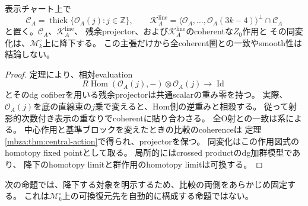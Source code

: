 \begin{corollary}[全O開上の同変compact残余圏]
\label{mbrd:cor:residual-family}
表示チャート上で
\[
 \mathcal C_A=\operatorname{thick}\{\mathcal O_A(j):j\in\mathbb Z\},
 \qquad
 \mathcal K_A^{\mathrm{line}}
 =\langle\mathcal O_A,\ldots,\mathcal O_A(3k-4)\rangle^\perp
    \cap\mathcal C_A
\]
と置く。$\mathcal C_A$、$\mathcal K_A^{\mathrm{line}}$、
残余projector、および$\mathcal K_A^{\mathrm{line}}$のcoherentな$Z_0$作用と
その同変化は、$\mathcal M_k^\circ$上に降下する。
この主張だけから全coherent圏との一致やsmooth性は結論しない。
\end{corollary}
\begin{proof}
定理により、相対evaluation
\[
 R\operatorname{Hom}(\mathcal O_A(j),-)\otimes\mathcal O_A(j)
       \longrightarrow\operatorname{Id}
\]
とそのdg cofiberを用いる残余projectorは共通scalarの重み零を持つ。
実際、$\mathcal O_A(j)$を底の直線束の$j$乗で変えると、Hom側の逆重みと相殺する。
従って射影的次数付き表示の重なりでcoherentに貼り合わさる。
全O射との一致は系による。
中心作用と基準ブロックを変えたときの比較のcoherenceは
定理\ref{mbza:thm:central-action}で得られ、projectorを保つ。
同変化はこの作用図式のhomotopy fixed pointとして取る。
局所的にはcrossed productのdg加群模型であり、
降下のhomotopy limitと群作用のhomotopy limitは可換する。
\end{proof}

次の命題では、降下する対象を明示するため、比較の両側をあらかじめ固定する。
これは$\mathcal M_k^\circ$上の可換復元先を自動的に構成する命題ではない。

